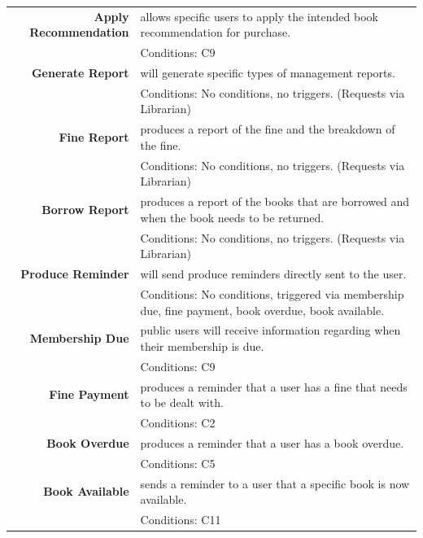 \begin{longtabu}{>{\bfseries}r X}
    Apply Recommendation & allows specific users to apply the intended book recommendation for purchase. \\ & Conditions: C9 \\
    \pagebreak Generate Report & will generate specific types of management reports. \\ & Conditions: No conditions, no triggers. (Requests via Librarian) \\
    Fine Report & produces a report of the fine and the breakdown of the fine. \\ & Conditions: No conditions, no triggers. (Requests via Librarian) \\
    Borrow Report & produces a report of the books that are borrowed and when the book needs to be returned. \\ & Conditions: No conditions, no triggers. (Requests via Librarian) \\
    Produce Reminder & will send produce reminders directly sent to the user. \\ & Conditions: No conditions, triggered via membership due, fine payment, book overdue, book available.  \\
    Membership Due & public users will receive information regarding when their membership is due.  \\ & Conditions: C9 \\
    Fine Payment & produces a reminder that a user has a fine that needs to be dealt with. \\ & Conditions: C2 \\
    Book Overdue & produces a reminder that a user has a book overdue. \\ & Conditions: C5 \\
    Book Available & sends a reminder to a user that a specific book is now available. \\ & Conditions: C11
\end{longtabu}
\endgroup

